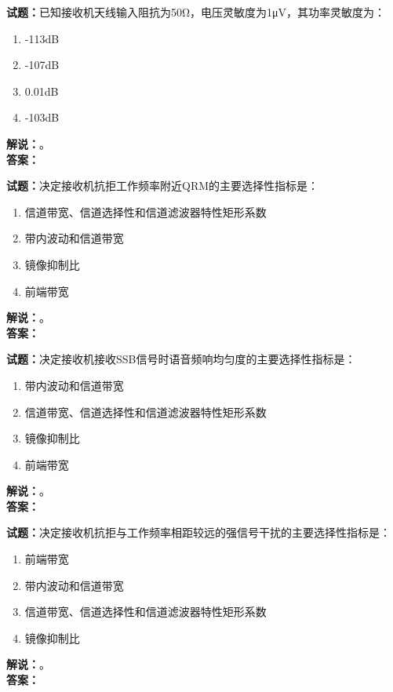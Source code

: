 \documentclass{ctexbook}
\begin{document}
\bigskip




\noindent\textbf{试题：}已知接收机天线输入阻抗为50Ω，电压灵敏度为1μV，其功率灵敏度为：
\begin{enumerate}[leftmargin=3em]
\item -113\unit[qualifier-mode=combine]{\deci\bel{}}
\item -107\unit[qualifier-mode=combine]{\deci\bel{}}
\item 0.01\unit[qualifier-mode=combine]{\deci\bel{}}
\item -103\unit[qualifier-mode=combine]{\deci\bel{}}
\end{enumerate}
\noindent\textbf{解说：}\textbf{}。\\\noindent\textbf{答案：}

\bigskip




\noindent\textbf{试题：}决定接收机抗拒工作频率附近QRM的主要选择性指标是：
\begin{enumerate}[leftmargin=3em]
\item 信道带宽、信道选择性和信道滤波器特性矩形系数
\item 带内波动和信道带宽
\item 镜像抑制比
\item 前端带宽
\end{enumerate}
\noindent\textbf{解说：}\textbf{}。\\\noindent\textbf{答案：}

\bigskip




\noindent\textbf{试题：}决定接收机接收SSB信号时语音频响均匀度的主要选择性指标是：
\begin{enumerate}[leftmargin=3em]
\item 带内波动和信道带宽
\item 信道带宽、信道选择性和信道滤波器特性矩形系数
\item 镜像抑制比
\item 前端带宽
\end{enumerate}
\noindent\textbf{解说：}\textbf{}。\\\noindent\textbf{答案：}

\bigskip




\noindent\textbf{试题：}决定接收机抗拒与工作频率相距较远的强信号干扰的主要选择性指标是：
\begin{enumerate}[leftmargin=3em]
\item 前端带宽
\item 带内波动和信道带宽
\item 信道带宽、信道选择性和信道滤波器特性矩形系数
\item 镜像抑制比
\end{enumerate}
\noindent\textbf{解说：}\textbf{}。\\\noindent\textbf{答案：}
\end{document}
